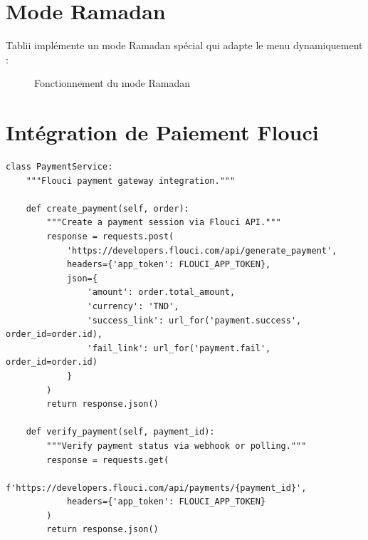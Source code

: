 \documentclass[12pt,a4paper]{report}
\begin{document}
\section{Mode Ramadan}

Tablii implémente un mode Ramadan spécial qui adapte le menu dynamiquement :

\begin{figure}[H]
    \centering
    \caption{Fonctionnement du mode Ramadan}
    \label{fig:ramadan}
\end{figure}

\section{Intégration de Paiement Flouci}

\begin{lstlisting}[caption={Service de Paiement -- \texttt{app/services/payment\_service.py}}]
class PaymentService:
    """Flouci payment gateway integration."""
    
    def create_payment(self, order):
        """Create a payment session via Flouci API."""
        response = requests.post(
            'https://developers.flouci.com/api/generate_payment',
            headers={'app_token': FLOUCI_APP_TOKEN},
            json={
                'amount': order.total_amount,
                'currency': 'TND',
                'success_link': url_for('payment.success', order_id=order.id),
                'fail_link': url_for('payment.fail', order_id=order.id)
            }
        )
        return response.json()
    
    def verify_payment(self, payment_id):
        """Verify payment status via webhook or polling."""
        response = requests.get(
            f'https://developers.flouci.com/api/payments/{payment_id}',
            headers={'app_token': FLOUCI_APP_TOKEN}
        )
        return response.json()
\end{lstlisting}
\end{document}
